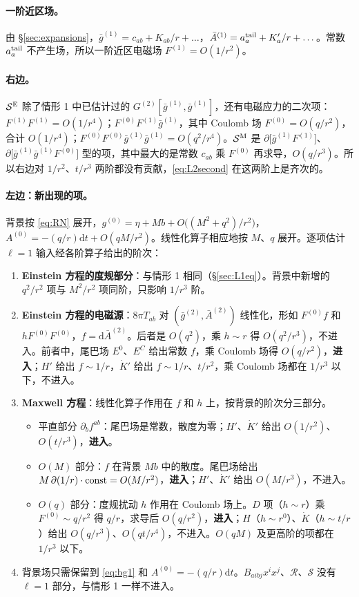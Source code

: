 \documentclass[11pt,a4paper]{ctexart}
\numberwithin{equation}{section}
\newcommand{\dd}{\mathrm d}
\begin{document}
\paragraph{一阶近区场。}由 \S\ref{sec:expansions}，$\bar g^{(1)}=c_{ab}+K_{ab}/r+\dots$，$\bar A^{(1)}=a^{\rm tail}_a+K'_a/r+\dots$。常数 $a^{\rm tail}_a$ 不产生场，所以一阶近区电磁场 $F^{(1)}=O(1/r^2)$。

\paragraph{右边。}$\mathcal S^{\rm E}$ 除了情形 1 中已估计过的 $G^{(2)}[\bar g^{(1)},\bar g^{(1)}]$，还有电磁应力的二次项：$F^{(1)}F^{(1)}=O(1/r^4)$；$F^{(0)}F^{(1)}\bar g^{(1)}$，其中 Coulomb 场 $F^{(0)}=O(q/r^2)$，合计 $O(1/r^4)$；$F^{(0)}F^{(0)}\bar g^{(1)}\bar g^{(1)}=O(q^2/r^4)$。$\mathcal S^{\rm M}$ 是 $\partial\big[\bar g^{(1)}F^{(1)}\big]$、$\partial\big[\bar g^{(1)}\bar g^{(1)}F^{(0)}\big]$ 型的项，其中最大的是常数 $c_{ab}$ 乘 $F^{(0)}$ 再求导，$O(q/r^3)$。所以右边对 $1/r^2$、$t/r^3$ 两阶都没有贡献，\eqref{eq:L2second} 在这两阶上是齐次的。

\paragraph{左边：新出现的项。}背景按 \eqref{eq:RN} 展开，$g^{(0)}=\eta+Mb+O\big((M^2+q^2)/r^2\big)$，$A^{(0)}=-(q/r)\dd t+O(qM/r^2)$。线性化算子相应地按 $M$、$q$ 展开。逐项估计 $\ell=1$ 输入经各阶算子给出的阶次：
\begin{enumerate}
\item \textbf{Einstein 方程的度规部分}：与情形 1 相同（\S\ref{sec:L1eq}）。背景中新增的 $q^2/r^2$ 项与 $M^2/r^2$ 项同阶，只影响 $1/r^3$ 阶。
\item \textbf{Einstein 方程的电磁源}：$8\pi T_{ab}$ 对 $(\bar g^{(2)},\bar A^{(2)})$ 线性化，形如 $F^{(0)}f$ 和 $hF^{(0)}F^{(0)}$，$f=\dd\bar A^{(2)}$。后者是 $O(q^2)$，乘 $h\sim r$ 得 $O(q^2/r^3)$，不进入。前者中，尾巴场 $E^0$、$E^C$ 给出常数 $f$，乘 Coulomb 场得 $O(q/r^2)$，\textbf{进入}；$H'$ 给出 $f\sim1/r$，$\dot K'$ 给出 $f\sim1/r$、$t/r^2$，乘 Coulomb 场都在 $1/r^3$ 以下，不进入。
\item \textbf{Maxwell 方程}：线性化算子作用在 $f$ 和 $h$ 上，按背景的阶次分三部分。
\begin{itemize}
\item 平直部分 $\partial_bf^{ab}$：尾巴场是常数，散度为零；$H'$、$\dot K'$ 给出 $O(1/r^2)$、$O(t/r^3)$，\textbf{进入}。
\item $O(M)$ 部分：$f$ 在背景 $Mb$ 中的散度。尾巴场给出 $M\,\partial(1/r)\cdot{\rm const}=O(M/r^2)$，\textbf{进入}；$H'$、$\dot K'$ 给出 $O(M/r^3)$，不进入。
\item $O(q)$ 部分：度规扰动 $h$ 作用在 Coulomb 场上。$D$ 项（$h\sim r$）乘 $F^{(0)}\sim q/r^2$ 得 $q/r$，求导后 $O(q/r^2)$，\textbf{进入}；$H$（$h\sim r^0$）、$\dot K$（$h\sim t/r$）给出 $O(q/r^3)$、$O(qt/r^4)$，不进入。$O(qM)$ 及更高阶的项都在 $1/r^3$ 以下。
\end{itemize}
\item 背景场只需保留到 \eqref{eq:bg1} 和 $A^{(0)}=-(q/r)\dd t$。$B_{aibj}x^ix^j$、$\mathcal R$、$\mathcal S$ 没有 $\ell=1$ 部分，与情形 1 一样不进入。
\end{enumerate}
\end{document}
